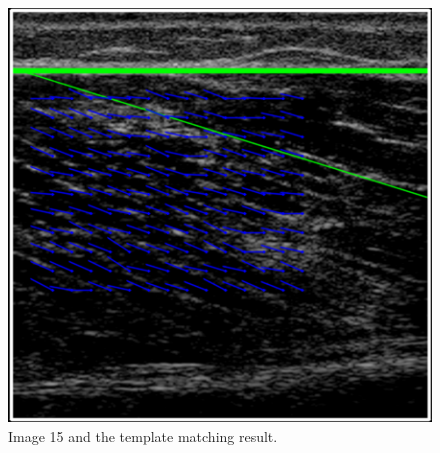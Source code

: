 \documentclass[10pt,twocolumn,letterpaper]{article}
\begin{document}
\begin{figure}
	\begin{center}		
		\includegraphics[width=1\linewidth]{img/im15_templ}
	\end{center}
	\caption{Image 15 and the template matching result.}
	\label{fig:im15_templ}
	
\end{figure}
\end{document}
